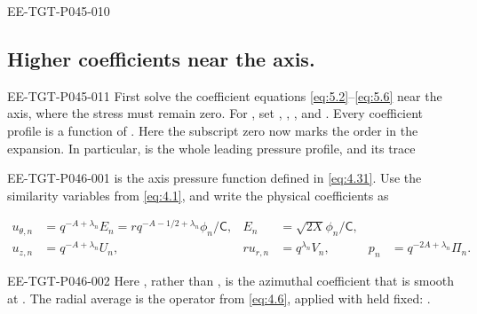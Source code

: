 \begin{EESegment}{EE-TGT-P045-010}
\subsection{Higher coefficients near the axis.}
\label{sec:5.1}
\end{EESegment}
\begin{EESegment}{EE-TGT-P045-011}
First solve the coefficient equations \eqref{eq:5.2}--\eqref{eq:5.6} near the axis, where the
stress must remain zero. For , set
, ,
, and . Every coefficient profile is a
function of . Here the subscript zero now marks the order in the
expansion. In particular,  is the whole leading pressure
profile, and its trace
\end{EESegment}
%
\begin{EESegment}{EE-TGT-P046-001}
 is the axis pressure function defined in
\eqref{eq:4.31}. Use the similarity variables from \eqref{eq:4.1}, and write the physical
coefficients as
\end{EESegment}
\begin{equation}
\label{eq:5.1}
\begin{aligned}
u_{\theta,n}&=q^{-A+\lambda_n}E_n
=rq^{-A-1/2+\lambda_n}\phi_n/\mathsf C,
& E_n&=\sqrt{2X}\phi_n/\mathsf C,\\
u_{z,n}&=q^{-A+\lambda_n}U_n,
& ru_{r,n}&=q^{\lambda_n}V_n,
& p_n&=q^{-2A+\lambda_n}\Pi_n.
\end{aligned}
\tag{5.1}
\end{equation}
\begin{EESegment}{EE-TGT-P046-002}
Here , rather than , is the azimuthal
coefficient that is smooth at . The radial average is the operator
from \eqref{eq:4.6}, applied with  held fixed:
.
\end{EESegment}

